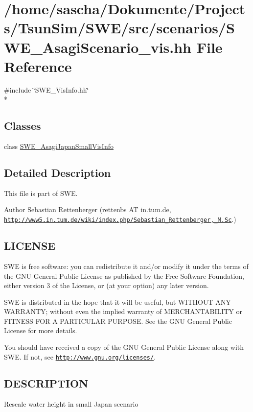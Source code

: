 \hypertarget{SWE__AsagiScenario__vis_8hh}{\section{/home/sascha/\-Dokumente/\-Projects/\-Tsun\-Sim/\-S\-W\-E/src/scenarios/\-S\-W\-E\-\_\-\-Asagi\-Scenario\-\_\-vis.hh File Reference}
\label{SWE__AsagiScenario__vis_8hh}
}
{\ttfamily \#include \char`\"{}S\-W\-E\-\_\-\-Vis\-Info.\-hh\char`\"{}}\\*
\subsection*{Classes}
\begin{DoxyCompactItemize}
\item 
class \hyperlink{classSWE__AsagiJapanSmallVisInfo}{S\-W\-E\-\_\-\-Asagi\-Japan\-Small\-Vis\-Info}
\end{DoxyCompactItemize}


\subsection{Detailed Description}
This file is part of S\-W\-E.

\begin{DoxyAuthor}{Author}
Sebastian Rettenberger (rettenbs A\-T in.\-tum.\-de, \href{http://www5.in.tum.de/wiki/index.php/Sebastian_Rettenberger,_M.Sc}{\tt http\-://www5.\-in.\-tum.\-de/wiki/index.\-php/\-Sebastian\-\_\-\-Rettenberger,\-\_\-\-M.\-Sc}.)
\end{DoxyAuthor}
\hypertarget{Writer_8hh_LICENSE}{}\subsection{L\-I\-C\-E\-N\-S\-E}\label{Writer_8hh_LICENSE}
S\-W\-E is free software\-: you can redistribute it and/or modify it under the terms of the G\-N\-U General Public License as published by the Free Software Foundation, either version 3 of the License, or (at your option) any later version.

S\-W\-E is distributed in the hope that it will be useful, but W\-I\-T\-H\-O\-U\-T A\-N\-Y W\-A\-R\-R\-A\-N\-T\-Y; without even the implied warranty of M\-E\-R\-C\-H\-A\-N\-T\-A\-B\-I\-L\-I\-T\-Y or F\-I\-T\-N\-E\-S\-S F\-O\-R A P\-A\-R\-T\-I\-C\-U\-L\-A\-R P\-U\-R\-P\-O\-S\-E. See the G\-N\-U General Public License for more details.

You should have received a copy of the G\-N\-U General Public License along with S\-W\-E. If not, see \href{http://www.gnu.org/licenses/}{\tt http\-://www.\-gnu.\-org/licenses/}.\hypertarget{NetCdfWriter_8hh_DESCRIPTION}{}\subsection{D\-E\-S\-C\-R\-I\-P\-T\-I\-O\-N}\label{NetCdfWriter_8hh_DESCRIPTION}
Rescale water height in small Japan scenario 